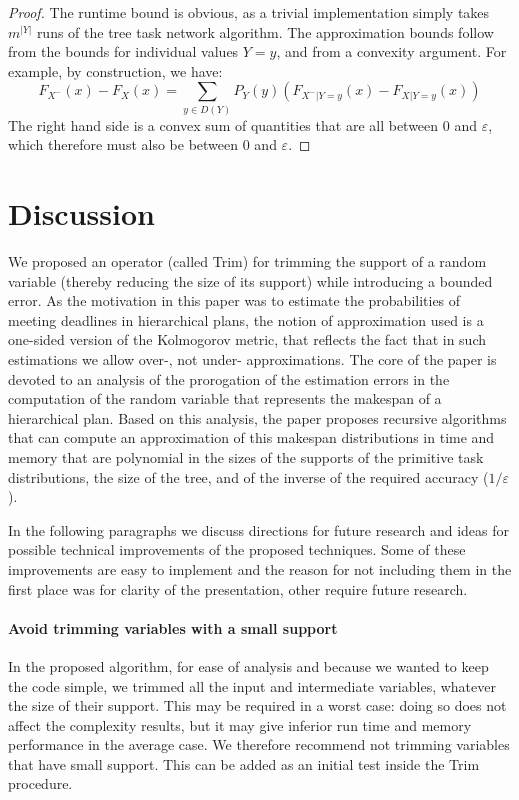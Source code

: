 \documentclass[review]{elsarticle}
\begin{document}
\begin{proof}
The runtime bound is obvious, as a trivial implementation simply takes $m^{|Y|}$
runs of the tree task network algorithm. The approximation bounds follow
from the bounds for individual values $Y=y$, and from a convexity argument.
For example, by construction, we have:
\[
F_{X^-}(x) -  F_{X}(x) =  \sum_{y\in D(Y)} P_{Y}(y)(F_{X^-|Y=y}(x) - F_{X|Y=y}(x))
\]
The right hand side is a convex sum of quantities that are all between 0 and $\varepsilon$, which therefore
must also be between 0 and $\varepsilon$.
\end{proof}

\section{Discussion}\label{sec:discussion}


We proposed an operator (called Trim) for trimming 
the support of a random variable
(thereby reducing the size of its support) while introducing a bounded error. As the motivation in this paper was to estimate the probabilities of meeting deadlines in hierarchical plans, the notion of approximation used is a one-sided version of the Kolmogorov metric, that reflects the fact that in such estimations we allow over-, not under- approximations. The core of the paper is devoted to an analysis of the prorogation of the estimation errors in the computation of the random variable that represents the makespan of a hierarchical plan. Based on this analysis, the paper proposes recursive algorithms that can compute an approximation of this makespan distributions in time and memory that are polynomial in the sizes of the supports of the primitive task distributions, the size of the tree, and of the inverse of the required accuracy ($1/\varepsilon$).

In the following paragraphs we discuss directions for future research and ideas for possible technical improvements of the proposed techniques. Some of these improvements are easy to implement and the reason for not including them in the first place was for clarity of the presentation, other require future research.


\paragraph{Avoid trimming variables with a small support} In the proposed algorithm, for ease of analysis and because we wanted to keep the code simple, we trimmed all the input and intermediate variables, whatever the size of their support. This may be required in a worst case:  doing so does not affect the complexity results, but it may give inferior run time and memory performance in the average case. We therefore recommend not trimming variables that have small support. This can be added as an initial test inside the Trim procedure.
\end{document}
